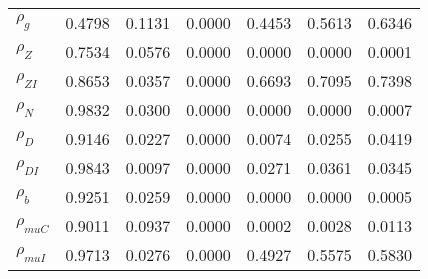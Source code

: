 \begin{center}
\begin{longtable}{lcccccc}
$ {\rho_g}             $	 & 	          0.4798	 & 	          0.1131	 & 	          0.0000	 & 	          0.4453	 & 	          0.5613	 & 	          0.6346 \\ 
$ {\rho_Z}             $	 & 	          0.7534	 & 	          0.0576	 & 	          0.0000	 & 	          0.0000	 & 	          0.0000	 & 	          0.0001 \\ 
$ {\rho_{ZI}}          $	 & 	          0.8653	 & 	          0.0357	 & 	          0.0000	 & 	          0.6693	 & 	          0.7095	 & 	          0.7398 \\ 
$ {\rho_N}             $	 & 	          0.9832	 & 	          0.0300	 & 	          0.0000	 & 	          0.0000	 & 	          0.0000	 & 	          0.0007 \\ 
$ {\rho_D}             $	 & 	          0.9146	 & 	          0.0227	 & 	          0.0000	 & 	          0.0074	 & 	          0.0255	 & 	          0.0419 \\ 
$ {\rho_{DI}}          $	 & 	          0.9843	 & 	          0.0097	 & 	          0.0000	 & 	          0.0271	 & 	          0.0361	 & 	          0.0345 \\ 
$ {\rho_b}             $	 & 	          0.9251	 & 	          0.0259	 & 	          0.0000	 & 	          0.0000	 & 	          0.0000	 & 	          0.0005 \\ 
$ {\rho_{muC}}         $	 & 	          0.9011	 & 	          0.0937	 & 	          0.0000	 & 	          0.0002	 & 	          0.0028	 & 	          0.0113 \\ 
$ {\rho_{muI}}         $	 & 	          0.9713	 & 	          0.0276	 & 	          0.0000	 & 	          0.4927	 & 	          0.5575	 & 	          0.5830 \\ 
\end{longtable}
 \end{center}
